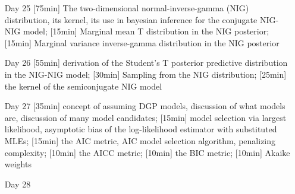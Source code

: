 \begin{enumerate}
\item[Day 25] [75min] The two-dimensional  normal-inverse-gamma (NIG) distribution, its kernel, its use in bayesian inference for the conjugate NIG-NIG model; [15min] Marginal mean T distribution in the NIG posterior; [15min] Marginal variance inverse-gamma distribution in the NIG posterior


\item[Day 26] [55min] derivation of the Student's T posterior predictive distribution in the NIG-NIG model; [30min] Sampling from the NIG distribution; [25min] the kernel of the semiconjugate NIG model

\item[Day 27] [35min] concept of assuming DGP models, discussion of what models are, discussion of many model candidates; [15min] model selection via largest likelihood, asymptotic bias of the log-likelihood estimator with substituted MLEs; [15min] the AIC metric, AIC model selection algorithm, penalizing complexity; [10min] the AICC metric; [10min] the BIC metric; [10min] Akaike weights

\item[Day 28] 

\end{enumerate}